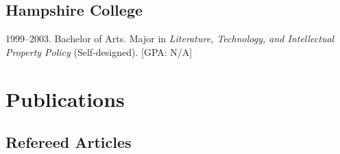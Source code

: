 \documentclass[10pt]{article}
\newenvironment{cvlist}{
\begin{list}{}{\leftmargin=3.0em \itemindent=-3.0em}
  \setlength{\itemsep}{0pt}
  \setlength{\parskip}{0em}
  \setlength{\parsep}{1em}
  \setlength{\parindent}{0em}}
{\vspace{1em}
\end{list}}
\begin{document}
\subsection{Hampshire College}
\begin{cvlist}
\item 1999--2003. Bachelor of Arts. Major in \emph{Literature,
    Technology, and Intellectual Property Policy} (Self-designed). [GPA: N/A]
\end{cvlist}

\section{Publications}

\subsection{Refereed Articles}
\end{document}
